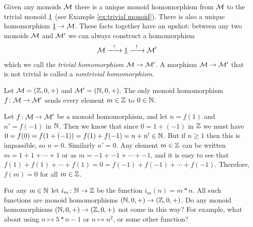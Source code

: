 \begin{applicationRUS}\label{app:RNA reader 1}
\end{applicationRUS}

\begin{exampleENG}\label{ex:trivial monoid homomorphism}
Given any monoids $\mathcal{M}$ there is a unique monoid homomorphism from $\mathcal{M}$ to the trivial monoid $\underline{1}$ (see Example \ref{ex:trivial monoid}). There is also a unique homomorphism $\underline{1}\rightarrow\mathcal{M}$. These facts together have an upshot: between any two monoids $\mathcal{M}$ and $\mathcal{M}'$ we can always construct a homomorphism 
$$\mathcal{M}\xrightarrow{\ \ !\ \ }\underline{1}\xrightarrow{\ \ !\ \ }\mathcal{M}'$$
which we call the {\em trivial homomorphism $\mathcal{M}\rightarrow\mathcal{M}'$}. A morphism $\mathcal{M}\rightarrow\mathcal{M}'$ that is not trivial is called a {\em nontrivial homomorphism}.
\end{exampleENG}

\begin{exampleRUS}\label{ex:trivial monoid homomorphism}
\end{exampleRUS}

\begin{propositionENG}\label{prop:int to nat trivial}
Let $\mathcal{M}=({\mathbb Z},0,+)$ and $\mathcal{M}'=({\mathbb N},0,+)$. The only monoid homomorphism $f\colon\mathcal{M}\rightarrow\mathcal{M}'$ sends every element $m\in{\mathbb Z}$ to $0\in{\mathbb N}$.
\end{propositionENG}

\begin{propositionRUS}\label{prop:int to nat trivial}
\end{propositionRUS}

\begin{proofENG}
Let $f\colon\mathcal{M}\rightarrow\mathcal{M}'$ be a monoid homomorphism, and let $n=f(1)$ and $n'=f(-1)$ in ${\mathbb N}$. Then we know that since $0=1+(-1)$ in ${\mathbb Z}$ we must have $0=f(0)=f(1+(-1))=f(1)+f(-1)=n+n'\in{\mathbb N}$. But if $n\geq 1$ then this is impossible, so $n=0$. Similarly $n'=0$. Any element $m\in{\mathbb Z}$ can be written $m=1+1+\cdots+1$ or as $m=-1+-1+\cdots+-1$, and it is easy to see that $f(1)+f(1)+\cdots+f(1)=0=f(-1)+f(-1)+\cdots+f(-1)$. Therefore, $f(m)=0$ for all $m\in{\mathbb Z}$. 
\end{proofENG}

\begin{proofRUS}
\end{proofRUS}

\begin{exerciseENG}
For any $m\in{\mathbb N}$ let $i_m\colon{\mathbb N}\rightarrow{\mathbb Z}$ be the function $i_m(n)=m*n$. All such functions are monoid homomorphisms $({\mathbb N},0,+)\rightarrow({\mathbb Z},0,+)$. Do any monoid homomorphisms $({\mathbb N},0,+)\rightarrow({\mathbb Z},0,+)$ not come in this way? For example, what about using $n\mapsto 5*n-1$ or $n\mapsto n^2$, or some other function? 
\end{exerciseENG}

